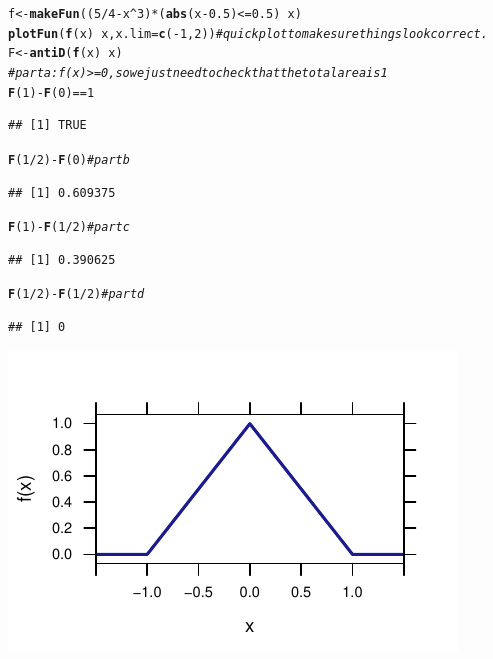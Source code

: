\documentclass[twoside]{book}\usepackage[]{graphicx}\usepackage[]{xcolor}
\makeatletter
\def\maxwidth{ %
  \ifdim\Gin@nat@width>\linewidth
    \linewidth
  \else
    \Gin@nat@width
  \fi
}
\newcommand{\hlnum}[1]{\textcolor[rgb]{0.686,0.059,0.569}{#1}}%
\newcommand{\hlcom}[1]{\textcolor[rgb]{0.678,0.584,0.686}{\textit{#1}}}%
\newcommand{\hlopt}[1]{\textcolor[rgb]{0,0,0}{#1}}%
\newcommand{\hlstd}[1]{\textcolor[rgb]{0.345,0.345,0.345}{#1}}%
\newcommand{\hlkwb}[1]{\textcolor[rgb]{0.69,0.353,0.396}{#1}}%
\newcommand{\hlkwc}[1]{\textcolor[rgb]{0.333,0.667,0.333}{#1}}%
\newcommand{\hlkwd}[1]{\textcolor[rgb]{0.737,0.353,0.396}{\textbf{#1}}}%
\newenvironment{kframe}{%
 \def\at@end@of@kframe{}%
 \ifinner\ifhmode%
  \def\at@end@of@kframe{\end{minipage}}%
  \begin{minipage}{\columnwidth}%
 \fi\fi%
 \def\FrameCommand##1{\hskip\@totalleftmargin \hskip-\fboxsep
 \colorbox{shadecolor}{##1}\hskip-\fboxsep
     \hskip-\linewidth \hskip-\@totalleftmargin \hskip\columnwidth}%
 \MakeFramed {\advance\hsize-\width
   \@totalleftmargin\z@ \linewidth\hsize
   \@setminipage}}%
 {\par\unskip\endMakeFramed%
 \at@end@of@kframe}
\newenvironment{knitrout}{}{} %
\makeatother
\begin{document}
\begin{solution}
\begin{knitrout}
\color{fgcolor}\begin{kframe}
\begin{alltt}
\hlstd{f} \hlkwb{<-} \hlkwd{makeFun}\hlstd{((}\hlnum{5}\hlopt{/}\hlnum{4} \hlopt{-} \hlstd{x}\hlopt{^}\hlnum{3}\hlstd{)} \hlopt{*} \hlstd{(}\hlkwd{abs}\hlstd{(x} \hlopt{-} \hlnum{0.5}\hlstd{)} \hlopt{<=} \hlnum{0.5}\hlstd{)} \hlopt{~} \hlstd{x)}
\hlkwd{plotFun}\hlstd{(}\hlkwd{f}\hlstd{(x)} \hlopt{~} \hlstd{x,} \hlkwc{x.lim} \hlstd{=} \hlkwd{c}\hlstd{(}\hlopt{-}\hlnum{1}\hlstd{,} \hlnum{2}\hlstd{))}  \hlcom{# quick plot to make sure things look correct.}
\hlstd{F} \hlkwb{<-} \hlkwd{antiD}\hlstd{(}\hlkwd{f}\hlstd{(x)} \hlopt{~} \hlstd{x)}
\hlcom{# part a: f(x) >=0, so we just need to check that the total area is 1}
\hlkwd{F}\hlstd{(}\hlnum{1}\hlstd{)} \hlopt{-} \hlkwd{F}\hlstd{(}\hlnum{0}\hlstd{)} \hlopt{==} \hlnum{1}
\end{alltt}
\begin{verbatim}
## [1] TRUE
\end{verbatim}
\begin{alltt}
\hlkwd{F}\hlstd{(}\hlnum{1}\hlopt{/}\hlnum{2}\hlstd{)} \hlopt{-} \hlkwd{F}\hlstd{(}\hlnum{0}\hlstd{)}  \hlcom{# part b}
\end{alltt}
\begin{verbatim}
## [1] 0.609375
\end{verbatim}
\begin{alltt}
\hlkwd{F}\hlstd{(}\hlnum{1}\hlstd{)} \hlopt{-} \hlkwd{F}\hlstd{(}\hlnum{1}\hlopt{/}\hlnum{2}\hlstd{)}  \hlcom{# part c}
\end{alltt}
\begin{verbatim}
## [1] 0.390625
\end{verbatim}
\begin{alltt}
\hlkwd{F}\hlstd{(}\hlnum{1}\hlopt{/}\hlnum{2}\hlstd{)} \hlopt{-} \hlkwd{F}\hlstd{(}\hlnum{1}\hlopt{/}\hlnum{2}\hlstd{)}  \hlcom{# part d}
\end{alltt}
\begin{verbatim}
## [1] 0
\end{verbatim}
\end{kframe}

{\centering \includegraphics[width=\maxwidth]{figures/fig-unnamed-chunk-61-1} 

}
\end{knitrout}
\end{solution}
\end{document}
